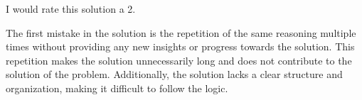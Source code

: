 I would rate this solution a 2.

The first mistake in the solution is the repetition of the same reasoning multiple times without providing any new insights or progress towards the solution. This repetition makes the solution unnecessarily long and does not contribute to the solution of the problem. Additionally, the solution lacks a clear structure and organization, making it difficult to follow the logic.
